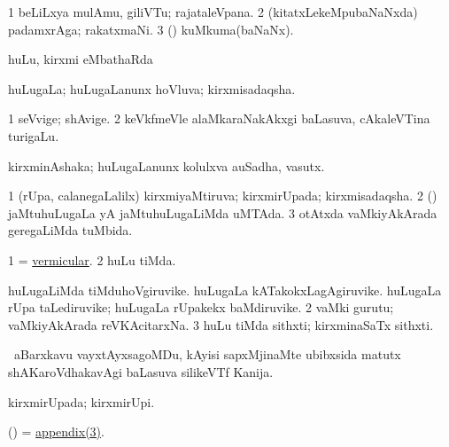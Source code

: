 \bentry
{} 
\gl{\nA}
\expl{}
\bmng
\bnum
\num{1} beLiLxya mulAmu, giliVTu; rajataleVpana. 
\num{2} (kitatxLekeMpubaNaNxda) padamxrAga; rakatxmaNi. 
\num{3} (\kAparx) kuMkuma(baNaNx). 
\enum
\emng
\eentry

\bentry
{} 
\gl{\sapUpa}
\expl{}
\bmng
huLu, kirxmi eMbathaRda \sapUpa 
\emng
\eentry

\bentry
{} 
\gl{\gu}
\expl{}
\bmng
huLugaLa; huLugaLanunx hoVluva; kirxmisadaqsha. 
\emng
\eentry

\bentry
{} 
\gl{\nA}
\expl{}
\bmng
\bnum
\num{1} seVvige; shAvige. 
\num{2} keVkfmeVle alaMkaraNakAkxgi baLasuva, cAkaleVTina turigaLu. 
\enum
\emng
\eentry

\bentry
{} 
\gl{\nA}
\expl{}
\bmng
kirxminAshaka; huLugaLanunx kolulxva auSadha, vasutx. 
\emng
\eentry

\bentry
{} 
\gl{\gu}
\expl{}
\bmng
\bnum
\num{1} (rUpa, calanegaLalilx) kirxmiyaMtiruva; kirxmirUpada; kirxmisadaqsha. 
\num{2} (\veYshA) jaMtuhuLugaLa yA jaMtuhuLugaLiMda uMTAda. 
\num{3} otAtxda vaMkiyAkArada geregaLiMda tuMbida. 
\enum
\emng
\eentry

\bentry
{} 
\gl{\gu}
\expl{}
\bmng
\bnum
\num{1} = \hyperlink{vermicular}{vermicular}. 
\num{2} huLu tiMda. 
\enum
\emng
\eentry

\bentry
{} 
\gl{\nA}
\expl{}
\bmng
\bnum
{} 
\banum
{} huLugaLiMda tiMduhoVgiruvike. 
 huLugaLa kATakokxLagAgiruvike. 
 huLugaLa rUpa taLediruvike; huLugaLa rUpakekx baMdiruvike. 
\eanum
\numie
\num{2} vaMki gurutu; vaMkiyAkArada reVKAcitarxNa. 
\num{3} huLu tiMda sithxti; kirxminaSaTx sithxti. 
\enum
\emng
\eentry

\bentry
{} 
\gl{\nA}
\expl{}
\bmng
 \sA\ aBarxkavu vayxtAyxsagoMDu, kAyisi sapxMjinaMte ubibxsida matutx shAKaroVdhakavAgi baLasuva silikeVTf Kanija. 
\emng
\eentry

\bentry
{} 
\gl{\gu}
\expl{}
\bmng
 kirxmirUpada; kirxmirUpi. 
\emng
\eentry

\bentry
{}
\gl{\nA}
\expl{}
\bmng
 (\aMrashA) = \hyperref{kandict_a.pdf}{A}{appendix(3)}{appendix(3)}. 
\emng
\eentry

